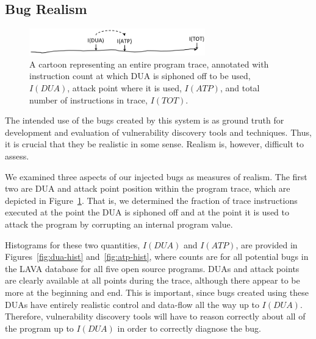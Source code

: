 \subsection{Bug Realism}


\begin{figure}
\centering
\includegraphics[width=3in]{trace-dua-atp.png}
\caption{A cartoon representing an entire program trace, annotated with instruction count at which DUA is siphoned off to be used, $I(DUA)$, attack point where it is used, $I(ATP)$, and total number of instructions in trace, $I(TOT)$.}
\label{fig:dua-atp-trace}
\end{figure}

The intended use of the bugs created by this system is as ground truth for development and evaluation of vulnerability discovery tools and techniques. 
Thus, it is crucial that they be realistic in some sense.  
Realism is, however, difficult to assess.

We examined three aspects of our injected bugs as measures of realism. 
The first two are DUA and attack point position within the program trace, which are depicted in Figure~\ref{fig:dua-atp-trace}.
That is, we determined the fraction of trace instructions executed at the point the DUA is siphoned off and at the point it is used to attack the program by corrupting an internal program value.

Histograms for these two quantities, $I(DUA)$ and $I(ATP)$, are provided in Figures~\ref{fig:dua-hist} and~\ref{fig:atp-hist}, where counts are for all potential bugs in the LAVA database for all five open source programs. 
DUAs and attack points are clearly available at all points during the trace, although there appear to be more at the beginning and end.
This is important, since bugs created using these DUAs have entirely realistic control and data-flow all the way up to $I(DUA)$.
Therefore, vulnerability discovery tools will have to reason correctly about all of the program up to $I(DUA)$ in order to correctly diagnose the bug.

